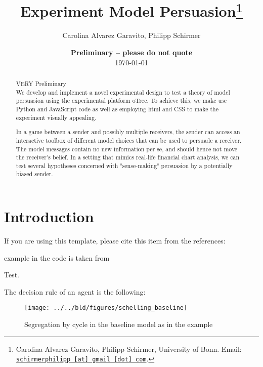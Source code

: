 \documentclass[11pt, a4paper, leqno]{article}
\begin{document}
\title{Experiment Model Persuasion\thanks{Carolina Alvarez Garavito, Philipp Schirmer, University of Bonn. Email: \href{mailto:schirmerphilipp@gmail.com}{\nolinkurl{schirmerphilipp [at] gmail [dot] com}}.}}

\author{Carolina Alvarez Garavito, Philipp Schirmer}

\date{
    {\bf Preliminary -- please do not quote}
    \\[1ex]
    \today
}

\maketitle


\begin{abstract}
    VERY Preliminary \\

    We develop and implement a novel experimental design to test a theory of model persuasion using the 
    experimental platform oTree. To achieve this, we make use Python and JavaScript code as well as 
    employing html and CSS to make the experiment visually appealing.

    In a game between a sender and possibly multiple receivers, the sender can access an interactive toolbox of
    different model choices that can be used to persuade a receiver. The model messages contain no
    new information per se, and should hence not move the receiver's belief. In a setting that mimics real-life
    financial chart analysis, we can test several hypotheses concerned with "sense-making" persuasion by
    a potentially biased sender.
\end{abstract}
\clearpage

\section{Introduction} %
\label{sec:introduction}

If you are using this template, please cite this item from the references: \cite{GaudeckerEconProjectTemplates}

\cite{Schelling69} example in the code is taken from \cite{StachurskiSargent13}

Test.

The decision rule of an agent is the following:


\begin{figure}
    \caption{Segregation by cycle in the baseline \cite{Schelling69} model as in the \cite{StachurskiSargent13} example
    }

    \texttt{[image: ../../bld/figures/schelling\_baseline]}

\end{figure}
\end{document}
